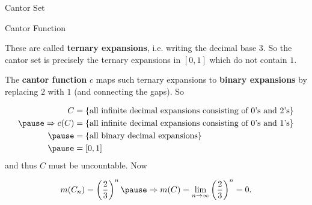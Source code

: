 \documentclass[9pt]{beamer}
\begin{document}
\begin{frame}{Cantor Set}
\begin{center}
    
        \end{center}
        
    \end{frame}

    \begin{frame}{Cantor Function}

        These are called \textbf{ternary expansions}, i.e. writing the decimal base $3$.
        So the cantor set is precisely the ternary expansions in $[0, 1]$ which do not contain $1$.

        \pause

        \vspace{24pt}

        The \textbf{cantor function} $c$ maps such ternary expansions to \textbf{binary expansions} by replacing $2$ with $1$ (and connecting the gaps).
        So

        \begin{align*}
            C&=\{\text{all infinite decimal expansions consisting of $0$'s and $2$'s}\}\\\pause
            \Rightarrow c(C)&=\{\text{all infinite decimal expansions consisting of $0$'s and $1$'s}\}\\\pause
            &=\{\text{all binary decimal expansions}\}\\\pause
            &=[0, 1]
        \end{align*}
        and thus $C$ must be uncountable. \pause
        Now

        \[m(C_n)=\left(\frac{2}{3}\right)^n\pause\Rightarrow m(C)=\lim_{n\rightarrow\infty} \left(\frac{2}{3}\right)^n=0.\]
        
    \end{frame}
\end{document}
